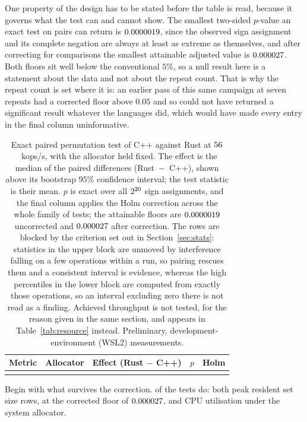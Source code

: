 \documentclass[english,twoside,openright,a4paper,censored,csm,software-track-2020]{HYthesisML}
\begin{document}
One property of the design has to be stated before the table is read, because it governs what
the test can and cannot show. The smallest two-sided $p$-value an exact test on \NRepeats{}
pairs can return is $0.0000019$, since the observed sign assignment and its complete
negation are always at least as extreme as themselves, and after correcting for \NTests{}
comparisons the smallest attainable adjusted value is $0.000027$. Both floors sit well
below the conventional $5\%$, so a null result here is a statement about the data and not
about the repeat count. That is why the repeat count is set where it is: an earlier pass of this
same campaign at seven repeats had a corrected floor above $0.05$ and so could not have
returned a significant result whatever the languages did, which would have made every entry in
the final column uninformative.

\begin{table}
\centering
\small
\caption[Exact paired permutation test of C++ against Rust]{Exact paired permutation test of C++ against Rust at $56$~kops/s, with the
allocator held fixed. The effect is the median of the \NRepeats{} paired differences
(Rust~$-$~C++), shown above its bootstrap $95\%$ confidence interval; the test statistic is
their mean. $p$ is exact over all $2^{20}$ sign assignments, and the final column
applies the Holm correction across the whole family of \NTests{} tests; the attainable floors
are $0.0000019$ uncorrected and $0.000027$ after correction. The rows are blocked
by the criterion set out in Section~\ref{sec:stats}: statistics in the upper block are unmoved
by interference falling on a few operations within a run, so pairing rescues them and a
consistent interval is evidence, whereas the high percentiles in the lower block are computed
from exactly those operations, so an interval excluding zero there is not read as a finding.
Achieved throughput is not tested, for the reason given in the same section, and appears in
Table~\ref{tab:resource} instead. Preliminary, development-environment (WSL2)
measurements.\label{tab:significance}}
\begin{tabular}{@{}l l r r r@{}}
\hline\hline
Metric & Allocator & Effect (Rust $-$ C++) & $p$ & Holm \\
\hline
\\
\hline
\end{tabular}
\end{table}

Begin with what survives the correction. \NSignificant{} of the \NTests{} tests do: both peak
resident set size rows, at the corrected floor of $0.000027$, and CPU utilisation under the
system allocator.
\end{document}

